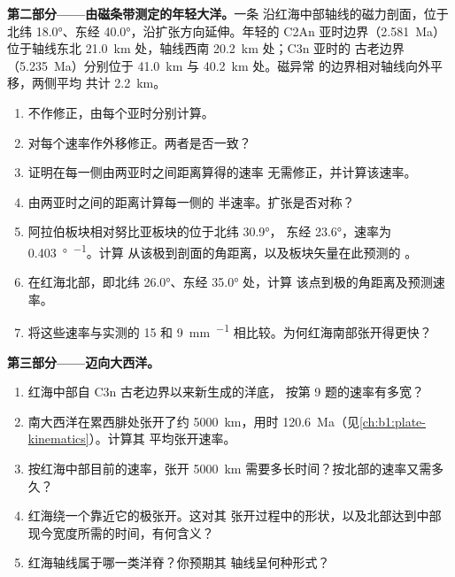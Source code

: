 \begin{problem}
\medskip
\noindent\textbf{第二部分——由磁条带测定的年轻大洋。}一条
沿红海中部轴线的磁力剖面，位于
北纬 \ang{18.0}、东经 \ang{40.0}，沿扩张方向延伸。年轻的
C2An 亚时边界（\qty{2.581}{Ma}）位于轴线东北
\qty{21.0}{km} 处，轴线西南 \qty{20.2}{km} 处；C3n 亚时的
古老边界（\qty{5.235}{Ma}）分别位于 \qty{41.0}{km} 与 \qty{40.2}{km} 处。磁异常
的边界相对轴线向外平移，两侧平均
共计 \qty{2.2}{km}。
\begin{enumerate}[resume]
  \item 不作修正，由每个亚时分别计算。
  \item 对每个速率作外移修正。两者是否一致？
  \item 证明在每一侧由两亚时之间距离算得的速率
        无需修正，并计算该速率。
  \item 由两亚时之间的距离计算每一侧的
        半速率。扩张是否对称？
  \item 阿拉伯板块相对努比亚板块的位于北纬 \ang{30.9}，
        东经 \ang{23.6}，速率为 \qty{0.403}{\degree\per\Ma}。计算
        从该极到剖面的角距离，以及板块矢量在此预测的
        。
  \item 在红海北部，即北纬 \ang{26.0}、东经 \ang{35.0} 处，计算
        该点到极的角距离及预测速率。
  \item 将这些速率与实测的 15 和
        \qty{9}{mm.^{-1}} 相比较。为何红海南部张开得更快？
\end{enumerate}

\medskip
\noindent\textbf{第三部分——迈向大西洋。}
\begin{enumerate}[resume]
  \item 红海中部自 C3n 古老边界以来新生成的洋底，
        按第 9 题的速率有多宽？
  \item 南大西洋在累西腓处张开了约 \qty{5000}{km}，用时
        \qty{120.6}{Ma}（见\cref{ch:b1:plate-kinematics}）。计算其
        平均张开速率。
  \item 按红海中部目前的速率，张开
        \qty{5000}{km} 需要多长时间？按北部的速率又需多久？
  \item 红海绕一个靠近它的极张开。这对其
        张开过程中的形状，以及北部达到中部
        现今宽度所需的时间，有何含义？
  \item 红海轴线属于哪一类洋脊？你预期其
        轴线呈何种形式？
\end{enumerate}


\end{problem}
